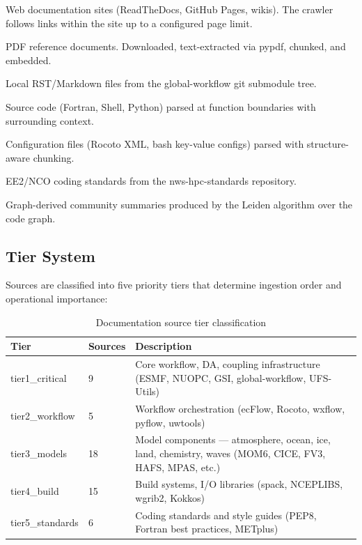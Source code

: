 \documentclass[11pt,letterpaper]{article}
\begin{document}
\begin{description}[style=nextline,leftmargin=2cm]
    \item[\texttt{url\_crawl}] Web documentation sites (ReadTheDocs,
    GitHub Pages, wikis). The crawler follows links within the site up
    to a configured page limit.
    \item[\texttt{pdf\_download}] PDF reference documents. Downloaded,
    text-extracted via pypdf, chunked, and embedded.
    \item[\texttt{on\_disk\_submodule}] Local RST/Markdown files from
    the global-workflow git submodule tree.
    \item[\texttt{code\_parse}] Source code (Fortran, Shell, Python)
    parsed at function boundaries with surrounding context.
    \item[\texttt{config\_parse}] Configuration files (Rocoto XML,
    bash key-value configs) parsed with structure-aware chunking.
    \item[\texttt{standards}] EE2/NCO coding standards from the
    nws-hpc-standards repository.
    \item[\texttt{community\_summary}] Graph-derived community
    summaries produced by the Leiden algorithm over the code graph.
\end{description}

\subsection{Tier System}

Sources are classified into five priority tiers that determine
ingestion order and operational importance:

\begin{table}[h]
\centering
\begin{tabular}{llp{7cm}}
\toprule
\textbf{Tier} & \textbf{Sources} & \textbf{Description} \\
\midrule
tier1\_critical & 9 & Core workflow, DA, coupling infrastructure
(ESMF, NUOPC, GSI, global-workflow, UFS-Utils) \\
tier2\_workflow & 5 & Workflow orchestration (ecFlow, Rocoto, wxflow,
pyflow, uwtools) \\
tier3\_models & 18 & Model components — atmosphere, ocean, ice, land,
chemistry, waves (MOM6, CICE, FV3, HAFS, MPAS, etc.) \\
tier4\_build & 15 & Build systems, I/O libraries (spack, NCEPLIBS,
wgrib2, Kokkos) \\
tier5\_standards & 6 & Coding standards and style guides (PEP8,
Fortran best practices, METplus) \\
\bottomrule
\end{tabular}
\caption{Documentation source tier classification}
\end{table}
\end{document}
